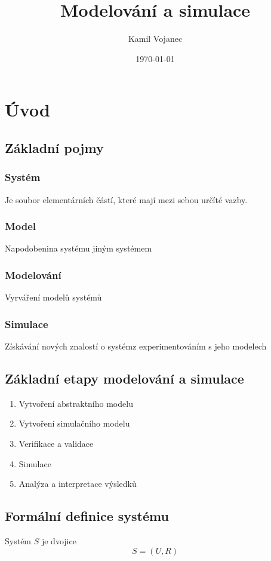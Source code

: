 \documentclass[11pt]{article}
\author{Kamil Vojanec}
\date{\today}
\title{Modelování a simulace}
\begin{document}
\maketitle
\tableofcontents

\section{Úvod}
\label{sec:org7c899c6}
\subsection{Základní pojmy}
\label{sec:org6010b3b}
\subsubsection{Systém}
\label{sec:org04e1638}
Je soubor elementárních částí, které mají mezi sebou určíté vazby.
\subsubsection{Model}
\label{sec:org0f9109f}
Napodobenina systému jiným systémem
\subsubsection{Modelování}
\label{sec:org5b4882e}
Vyrváření modelů systémů
\subsubsection{Simulace}
\label{sec:org776599c}
Získávání nových znalostí o systémz experimentováním s jeho modelech

\subsection{Základní etapy modelování a simulace}
\label{sec:org8120356}
\begin{enumerate}
\item Vytvoření abstraktního modelu
\item Vytvoření simulačního modelu
\item Verifikace a validace
\item Simulace
\item Analýza a interpretace výsledků
\end{enumerate}

\subsection{Formální definice systému}
\label{sec:orgd2bc696}
Systém \(S\) je dvojice
\[S = (U, R)\]
\end{document}
